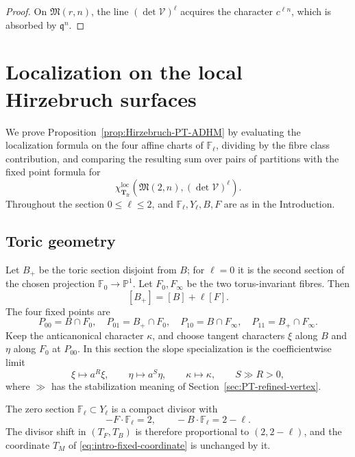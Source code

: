 \documentclass{amsart}
\theoremstyle{definition}
\numberwithin{equation}{section}
\newcommand{\cV}{\mathcal V}
\newcommand{\M}{\mathfrak M}
\begin{document}
\begin{proof}
On \(\M(r,n)\), the line \((\det\cV)^\ell\) acquires the character \(c^{\ell n}\), which is absorbed by \(\mathfrak q^n\).
\end{proof}



\section{Localization on the local Hirzebruch surfaces}
\label{sec:localization-ADHM}

We prove Proposition~\ref{prop:Hirzebruch-PT-ADHM} by evaluating the localization formula on the four affine charts of \(\mathbb F_\ell\), dividing by the fibre class contribution, and comparing the resulting sum over pairs of partitions with the fixed point formula for
\[
 \chi_{\mathbf T_{\mathrm{fr}}}^{\mathrm{loc}}(\M(2,n),(\det\cV)^\ell).
\]
Throughout the section \(0\leq\ell\leq2\), and \(\mathbb F_\ell,Y_\ell,B,F\) are as in the Introduction.

\subsection{Toric geometry}
Let \(B_+\) be the toric section disjoint from \(B\); for \(\ell=0\) it is the second section of the chosen projection \(\mathbb F_0\to\mathbb P^1\).  Let \(F_0,F_\infty\) be the two torus-invariant fibres.  Then
\[
 [B_+]=[B]+\ell[F].
\]
The four fixed points are
\[
 P_{00}=B\cap F_0,\quad P_{01}=B_+\cap F_0,\quad
 P_{10}=B\cap F_\infty,\quad P_{11}=B_+\cap F_\infty.
\]
Keep the anticanonical character \(\kappa\), and choose tangent characters \(\xi\) along \(B\) and \(\eta\) along \(F_0\) at \(P_{00}\).  In this section the slope specialization is the coefficientwise limit
\begin{equation}
 \xi\longmapsto a^R\xi,\qquad
 \eta\longmapsto a^S\eta,\qquad
 \kappa\longmapsto\kappa,\qquad S\gg R>0,
\label{eq:Hirzebruch-slope-choice}
\end{equation}
where \(\gg\) has the stabilization meaning of Section~\ref{sec:PT-refined-vertex}.

The zero section \(\mathbb F_\ell\subset Y_\ell\) is a compact divisor with
\[
 -F\cdot\mathbb F_\ell=2,\qquad
 -B\cdot\mathbb F_\ell=2-\ell.
\]
The divisor shift in \((T_F,T_B)\) is therefore proportional to \((2,2-\ell)\), and the coordinate \(T_M\) of \eqref{eq:intro-fixed-coordinate} is unchanged by it.
\end{document}
